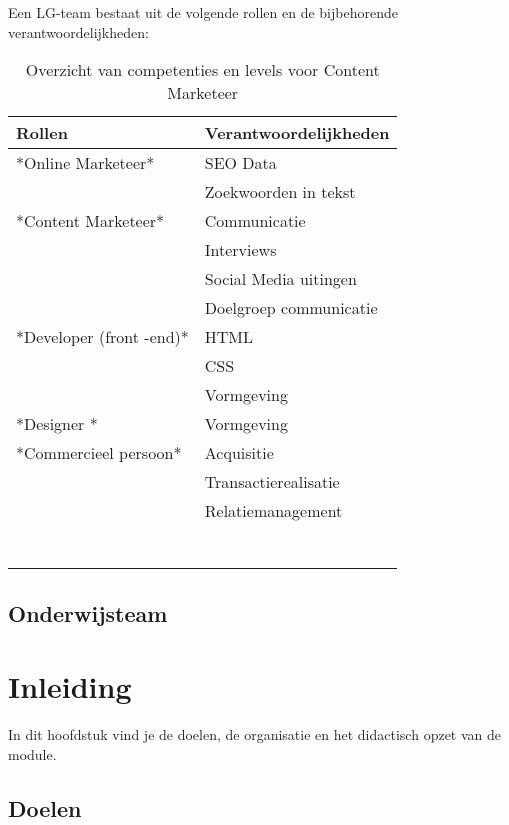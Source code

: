 \documentclass[]{book}
\begin{document}
Een LG-team bestaat uit de volgende rollen en de bijbehorende
verantwoordelijkheden:

\begin{table}

\caption{\label{tab:unnamed-chunk-1}Overzicht van competenties en levels voor Content Marketeer}
\centering
\begin{tabular}[t]{ll}
\toprule
Rollen & Verantwoordelijkheden\\
\midrule
*Online Marketeer* & SEO Data\\
 & Zoekwoorden in tekst\\
*Content Marketeer* & Communicatie\\
 & Interviews\\
 & Social Media uitingen\\
\addlinespace
 & Doelgroep communicatie\\
*Developer (front -end)* & HTML\\
 & CSS\\
 & Vormgeving\\
*Designer * & Vormgeving\\
\addlinespace
*Commercieel persoon* & Acquisitie\\
 & Transactierealisatie\\
 & Relatiemanagement\\
 & \\
 & \\
\addlinespace
 & \\
 & \\
 & \\
 & \\
 & \\
\bottomrule
\end{tabular}
\end{table}

\section{Onderwijsteam}\label{onderwijsteam}

\chapter{Inleiding}\label{inleiding}

In dit hoofdstuk vind je de doelen, de organisatie en het didactisch
opzet van de module.

\section{Doelen}\label{doelen}
\end{document}

